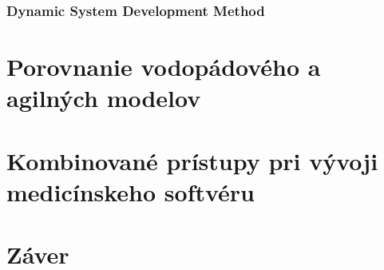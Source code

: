 \documentclass[10pt,twoside,slovak,a4paper]{article}
\begin{document}
\subsubsection{Dynamic System Development Method}
\section{Porovnanie vodopádového a agilných modelov}
\section{Kombinované prístupy pri vývoji medicínskeho softvéru}
\section{Záver}




\end{document}
